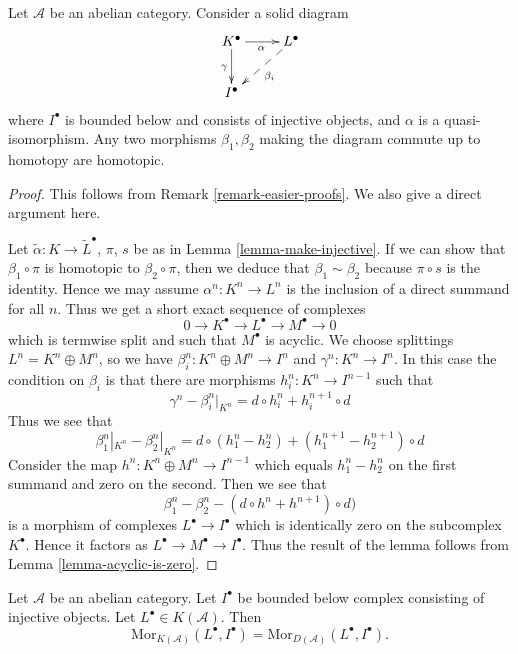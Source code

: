 \begin{lemma}
\label{lemma-morphisms-equal-up-to-homotopy}
Let $\mathcal{A}$ be an abelian category.
Consider a solid diagram
$$
\xymatrix{
K^\bullet \ar[r]_\alpha \ar[d]_\gamma & L^\bullet \ar@{-->}[dl]^{\beta_i} \\
I^\bullet
}
$$
where $I^\bullet$ is bounded below and consists of injective
objects, and $\alpha$ is a quasi-isomorphism.
Any two morphisms $\beta_1, \beta_2$ making the diagram commute
up to homotopy are homotopic.
\end{lemma}

\begin{proof}
This follows from
Remark \ref{remark-easier-proofs}.
We also give a direct argument here.

\medskip\noindent
Let $\tilde \alpha : K \to \tilde L^\bullet$, $\pi$, $s$ be as in
Lemma \ref{lemma-make-injective}. If we can show that $\beta_1 \circ\pi$
is homotopic to $\beta_2 \circ \pi$, then we deduce that
$\beta_1 \sim \beta_2$ because $\pi \circ s$ is the identity.
Hence we may assume $\alpha^n : K^n \to L^n$ is the
inclusion of a direct summand for all $n$. Thus we get a
short exact sequence of complexes
$$
0 \to K^\bullet \to L^\bullet \to M^\bullet \to 0
$$
which is termwise split and such that $M^\bullet$ is acyclic.
We choose splittings $L^n = K^n \oplus M^n$, so we have
$\beta_i^n : K^n \oplus M^n \to I^n$ and $\gamma^n : K^n \to I^n$.
In this case the condition on $\beta_i$ is that there are morphisms
$h_i^n : K^n \to I^{n - 1}$ such that
$$
\gamma^n - \beta_i^n|_{K^n} = d \circ h_i^n + h_i^{n + 1} \circ d
$$
Thus we see that
$$
\beta_1^n|_{K^n} - \beta_2^n|_{K^n}
=
d \circ (h_1^n - h_2^n) + (h_1^{n + 1} - h_2^{n + 1}) \circ d
$$
Consider the map $h^n : K^n \oplus M^n \to I^{n - 1}$ which
equals $h_1^n - h_2^n$ on the first summand and zero on the second.
Then we see that
$$
\beta_1^n - \beta_2^n
-
(d \circ h^n + h^{n + 1}) \circ d)
$$
is a morphism of complexes $L^\bullet \to I^\bullet$
which is identically zero on the subcomplex $K^\bullet$.
Hence it factors as $L^\bullet \to M^\bullet \to I^\bullet$.
Thus the result of the lemma follows from Lemma \ref{lemma-acyclic-is-zero}.
\end{proof}

\begin{lemma}
\label{lemma-morphisms-into-injective-complex}
Let $\mathcal{A}$ be an abelian category.
Let $I^\bullet$ be bounded below complex consisting of injective
objects. Let $L^\bullet \in K(\mathcal{A})$. Then
$$
\text{Mor}_{K(\mathcal{A})}(L^\bullet, I^\bullet)
=
\text{Mor}_{D(\mathcal{A})}(L^\bullet, I^\bullet).
$$
\end{lemma}

